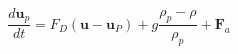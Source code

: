 \begin{equation}
	\frac{d\mathbf{u}_p}{dt}
    = F_D\left(\mathbf{u}-\mathbf{u}_P\right)
    + g\frac{\rho_p-\rho}{\rho_p}
    + \mathbf{F}_a
	\label{eq:lagrangian_ode}
\end{equation}